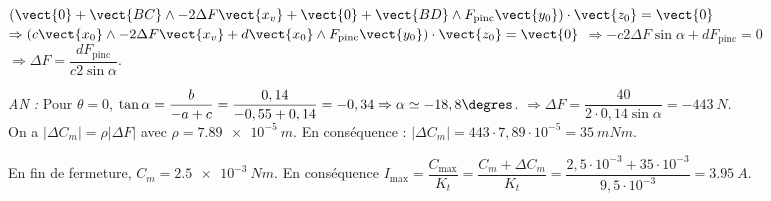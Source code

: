 \begin{corrigebox}[Corrigé]
$ \left( 
\vect{0} + \vect{BC}\wedge -2\Delta F \vect{x_v}
+ \vect{0} + \vect{BD}\wedge F_{\text{pinc}}\vect{y_0}
\right) \cdot \vect {z_0} = \vect{0} $
$\Rightarrow \left( 
c\vect{x_0}\wedge -2\Delta F \vect{x_v}
+ d\vect{x_0}\wedge F_{\text{pinc}}\vect{y_0}
\right) \cdot \vect {z_0} = \vect{0}$
$\Rightarrow  
-c 2\Delta F  \sin \alpha + dF_{\text{pinc}}  = {0} $
$\Rightarrow  
\Delta F  = \dfrac{dF_{\text{pinc}}}{c 2  \sin \alpha}  $. 

\textit{AN :}
Pour $\theta=0$, $ \tan \alpha = \dfrac{b}{-a+c}=\dfrac{0,14}{-0,55+0,14}=-0,34 \Rightarrow \alpha \simeq -18,8 \degres$.
$\Rightarrow  
\Delta F  = \dfrac{40}{2\cdot 0,14  \sin \alpha} = \SI{-443}{N} $.
~\\
On a $\left|\Delta C_m\right|=\rho \left|\Delta F \right|$ avec $\rho=\SI{7,89e-5}{m}$. En conséquence : $\left|\Delta C_m\right|=443 \cdot 7,89 \cdot 10^{-5} = \SI{35}{mNm}$.

En fin de fermeture, $C_m=\SI{2,5e-3}{Nm}$.
En conséquence $I_{\text{max}}=\dfrac{C_{\text{max}}}{K_t}=\dfrac{C_{m}+\Delta C_m}{K_t}=\dfrac{2,5\cdot 10^{-3}+35\cdot 10^{-3}}{9,5\cdot 10^{-3}}=\SI{3,95}{A}$.
%
%
%
\end{corrigebox}
